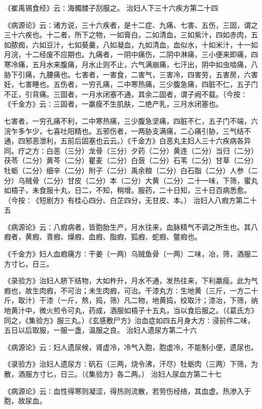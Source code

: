 \documentclass[a4paper,12pt,UTF8,twoside]{ctexbook}
\begin{document}
《崔禹锡食经》云∶海髑髅子刮服之。
治妇人下三十六疾方第二十四

《病源论》云∶诸方说，三十六疾者，是十二症、九痛、七害、五伤，三固，谓之三十六疾也。十二者，所下之物，一如膏白，二如清血，三如紫汁，四如赤肉，五如脓痂，六如豆汁，七如葵羹，八如凝血，九如清血，血似水，十如米汁，十一如月浣，十二经废不应期也。九痛者，一阴中痛伤，二阴中淋痛，三小便来即痛，四寒冷痛，五月水来腹痛，月水止则不止，六气满崩痛，七汗出，阴中如虫啮痛，八胁下引痛，九腰痛也。七害者，一害食，二害气，三害冷，四害劳，五害房，六害妊，七害睡也。五伤者，一穷孔痛，二中寒热痛，三少腹急痛，四脏不仁，五子门不正，引背痛。三固者，一月水闭塞不通，其余二固者，谓子阙不载。（今按∶《千金方》云∶三固者，一羸瘦不生肌肤，二绝产乳，三月水闭塞也。

七害者，一穷孔痛不利，二中寒热痛，三少腹急坚痛，四脏不仁，五子门不端，六浣乍多乍少，七喜吐阳精也。五邪伤者，一两胁支满痛，二心痛引胁，三气结不通，四邪恶泄利，五前后固塞也云云。）《千金方》白恶丸主妇人三十六疾病各异同。疗之方∶白恶（三分）龙骨（三分）夕药（二分）黄连（二分）当归（二分）茯苓（二分）黄芩（二分）瞿麦（二分）白蔹（二分）石苇（二分）甘草（二分）牡蛎（二分）细辛（二分）附子（二分）禹余粮（二分）白石脂（二分）人参（二分）乌贼骨（二分）甘皮（二分）本（二分）大黄（二分）二十一味，下筛，蜜丸如梧子，未食服十丸，日二，不知，稍增。服药，二十日知，三十日百病悉愈。（今按∶《短剧方》有桂心四分、白芷四分，无甘皮、本。）
治妇人八瘕方第二十五

《病源论》云∶八瘕病者，皆胞胎生产，月水往来，血脉精气不调之所生也。其八瘕者，黄瘕、青瘕、燥瘕、血瘕、脂瘕、狐瘕、蛇瘕、鳖瘕也。

《千金方》妇人血瘕痛方∶干姜（一两）乌贼鱼骨（一两）二味，冶，筛，酒服二方寸匕，日三。

《录验方》治妇人脐下结物，大如杵升，月水不通，发热往来，下利羸瘦。此为气瘕也，故生肉瘕，不可治；未生肉瘕，可治。干漆丸方∶生地黄（三斤，一方二十斤，取汁）干漆（一斤，熬，捣，筛）凡二物，地黄捣，绞取汁；漆冶，下筛，纳地黄汁中，微火煎令可丸，药成，酒服如梧子十五丸，当以食后服之。（《葛氏方》同之，《集验方》服三丸。）《玄感敷尸方》治血症如四五月身大方∶浸前件二味，五日以后取服，一服一盏，温服之良。
治妇人遗尿方第二十六

《病源论》云∶妇人遗尿候，肾虚冷，冷气入胞，胞虚冷，不能制小便，遗尿也。

《录验方》治妇人遗尿方∶矾石（三两，烧令沸，汗尽）牡蛎肉（三两）下筛，为散，酒服方寸匕，日三。（《集验方》各二两。）
治妇人尿血方第二十七

《病源论》云∶血性得寒则凝涩，得热则流散，若劳伤经络，其血虚。热渗入于胞，故尿血。
\end{document}
